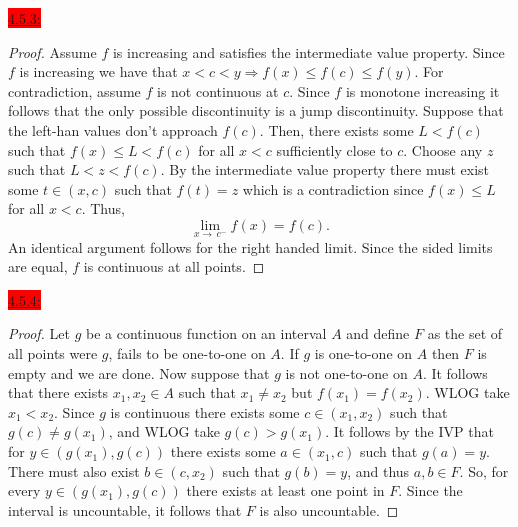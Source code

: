 \documentclass{exam}
\begin{document}
\colorbox{red}{\underline{4.5.3:}}
\begin{solution}
\begin{proof}
    Assume $f$ is increasing and satisfies the intermediate value property. Since $f$ is increasing we have that $x < c < y \Rightarrow f(x) \leq f(c) \leq f(y)$. For contradiction, assume $f$ is not continuous at $c$. Since $f$ is monotone increasing it follows that the only possible discontinuity is a jump discontinuity. Suppose that the left-han values don't approach $f(c)$. Then, there exists some $L < f(c)$ such that $f(x) \leq L < f(c)$ for all $x < c$ sufficiently close to $c$. Choose any $z$ such that $L < z < f(c)$. By the intermediate value property there must exist some $t \in (x, c)$ such that $f(t) = z$ which is a contradiction since $f(x) \leq L$ for all $x < c$. Thus, 
    \[
        \lim_{x\to\,c^{-}}f(x) = f(c).
    \]
    An identical argument follows for the right handed limit. Since the sided limits are equal, $f$ is continuous at all points.
\end{proof} 
\end{solution}

\colorbox{red}{\underline{4.5.4:}}
\begin{solution}
\begin{proof}
    Let $g$ be a continuous function on an interval $A$ and define $F$ as the set of all points were $g$, fails to be one-to-one on $A$. If $g$ is one-to-one on $A$ then $F$ is empty and we are done. Now suppose that $g$ is not one-to-one on $A$. It follows that there exists $x_1, x_2 \in A$ such that $x_1 \neq x_2$ but $f(x_1) = f(x_2)$. WLOG take $x_1 < x_2$. Since $g$ is continuous there exists some $c \in (x_1, x_2)$ such that $g(c) \neq g(x_1)$, and WLOG take $g(c) > g(x_1)$. It follows by the IVP that for $y \in (g(x_1), g(c))$ there exists some $a \in (x_1, c)$ such that $g(a) = y$. There must also exist $b \in (c, x_2)$ such that $g(b) = y$, and thus $a, b \in F$. So, for every $y \in (g(x_1), g(c))$ there exists at least one point in $F$. Since the interval is uncountable, it follows that $F$ is also uncountable. 
\end{proof}    
\end{solution}
\end{document}
